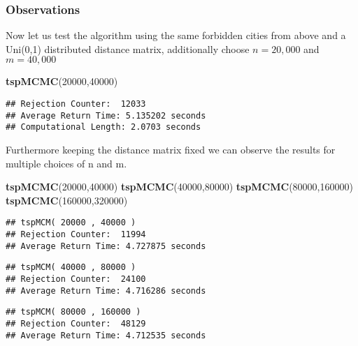 \documentclass[
]{article}
\newenvironment{Shaded}{\begin{snugshade}}{\end{snugshade}}
\newcommand{\DecValTok}[1]{\textcolor[rgb]{0.00,0.00,0.81}{#1}}
\newcommand{\KeywordTok}[1]{\textcolor[rgb]{0.13,0.29,0.53}{\textbf{#1}}}
\newcommand{\NormalTok}[1]{#1}
\begin{document}
\hypertarget{observations}{%
\subsubsection{Observations}\label{observations}}

Now let us test the algorithm using the same forbidden cities from above
and a Uni(0,1) distributed distance matrix, additionally choose
\(n=20,000\) and \(m=40,000\)

\begin{Shaded}
\begin{Highlighting}[]
\KeywordTok{tspMCMC}\NormalTok{(}\DecValTok{20000}\NormalTok{,}\DecValTok{40000}\NormalTok{)}
\end{Highlighting}
\end{Shaded}

\begin{verbatim}
## Rejection Counter:  12033 
## Average Return Time: 5.135202 seconds 
## Computational Length: 2.0703 seconds
\end{verbatim}

Furthermore keeping the distance matrix fixed we can observe the results
for multiple choices of n and m.

\begin{Shaded}
\begin{Highlighting}[]
\KeywordTok{tspMCMC}\NormalTok{(}\DecValTok{20000}\NormalTok{,}\DecValTok{40000}\NormalTok{)}
\KeywordTok{tspMCMC}\NormalTok{(}\DecValTok{40000}\NormalTok{,}\DecValTok{80000}\NormalTok{)}
\KeywordTok{tspMCMC}\NormalTok{(}\DecValTok{80000}\NormalTok{,}\DecValTok{160000}\NormalTok{)}
\KeywordTok{tspMCMC}\NormalTok{(}\DecValTok{160000}\NormalTok{,}\DecValTok{320000}\NormalTok{)}
\end{Highlighting}
\end{Shaded}

\begin{verbatim}
## tspMCM( 20000 , 40000 ) 
## Rejection Counter:  11994 
## Average Return Time: 4.727875 seconds
\end{verbatim}

\begin{verbatim}
## tspMCM( 40000 , 80000 ) 
## Rejection Counter:  24100 
## Average Return Time: 4.716286 seconds
\end{verbatim}

\begin{verbatim}
## tspMCM( 80000 , 160000 ) 
## Rejection Counter:  48129 
## Average Return Time: 4.712535 seconds
\end{verbatim}
\end{document}
